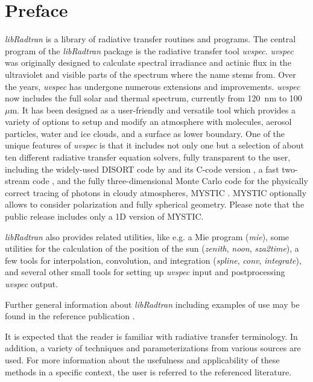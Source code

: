 \chapter{Preface}
\label{sec:intro}


{\sl libRadtran} is a library of radiative transfer routines and
programs.  The central program of the {\sl libRadtran} package is the
radiative transfer tool {\sl uvspec}.  {\sl uvspec} was originally
designed to calculate spectral irradiance and actinic flux in the
ultraviolet and visible parts of the spectrum \citep{kylling92a} where
the name stems from. Over the years, {\sl uvspec} has undergone
numerous extensions and improvements. {\sl uvspec} now includes the
full solar and thermal spectrum, currently from 120~nm to
100~$\mu$m. It has been designed as a user-friendly and versatile tool
which provides a variety of options to setup and modify an atmosphere
with molecules, aerosol particles, water and ice clouds, and a surface
as lower boundary. One of the unique features of {\sl uvspec} is that
it includes not only one but a selection of about ten different
radiative transfer equation solvers, fully transparent to the user,
including the widely-used DISORT code by \citet{Stamnes1988c} and its
C-code version \citep{buras2011b}, a fast two-stream code
\citep{Kylling1995}, and the fully three-dimensional Monte
Carlo code for the physically correct tracing of photons in cloudy
atmospheres, MYSTIC \citep{mayer2009, emde2007, emde2010, buras2011a,
emde2011}. MYSTIC optionally allows to consider polarization and fully
spherical geometry. Please note that the public release includes only a
1D version of MYSTIC.

{\sl libRadtran} also provides related utilities, like e.g. a Mie program 
({\sl mie}), some utilities for the calculation of the position of the 
sun ({\sl zenith}, {\sl noon}, {\sl sza2time}), a few tools for 
interpolation, convolution, and integration ({\sl spline}, {\sl conv}, 
{\sl integrate}), and several other small tools for setting up
{\sl uvspec} input and postprocessing {\sl uvspec} output. 

Further general information about {\sl libRadtran} including examples
of use may be found in the
reference publication \citep{mayer2005}. 

It is expected that the reader is familiar with radiative transfer
terminology. In addition, a variety of techniques and
parameterizations from various sources are used. For more information
about the usefulness and applicability of these methods in a specific
context, the user is referred to the referenced literature.

